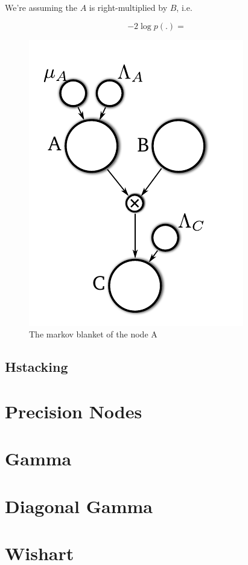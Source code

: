 \documentclass{article}
\newcommand{\<}{\langle}
\renewcommand{\>}{\rangle}
\begin{document}
We're assuming the $A$ is right-multiplied by $B$, i.e. %

\begin{equation}
-2 \log p(.) = 
\end{equation}


\begin{figure}
\includegraphics{images/mult_markov}
\caption{The markov blanket of the node A}
\label{fig:mult_markov}
\end{figure}

\subsection{Hstacking}

\section{Precision Nodes}
\section{Gamma}
\section{Diagonal Gamma}
\section{Wishart}
\end{document}
